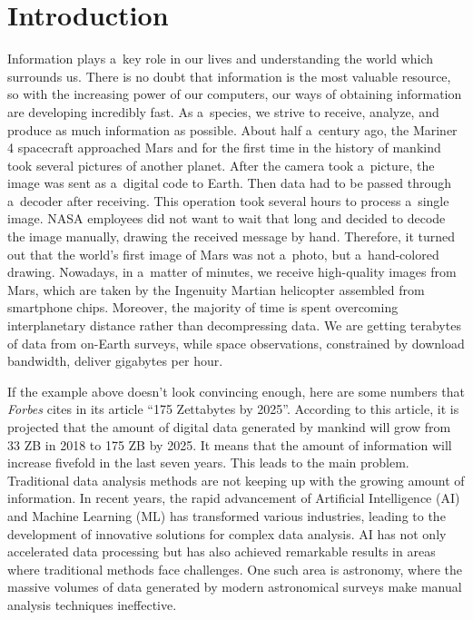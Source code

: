 
% 

\chapter{Introduction}

Information plays a~key role in our lives and understanding the world which surrounds us. There is no doubt that information is the most valuable resource, so with the increasing power of our computers, our ways of obtaining information are developing incredibly fast. As a~species, we strive to receive, analyze, and produce as much information as possible. About half a~century ago, the Mariner 4 spacecraft approached Mars and for the first time in the history of mankind took several pictures of another planet. After the camera took a~picture, the image was sent as a~digital code to Earth. Then data had to be passed through a~decoder after receiving. This operation took several hours to process a~single image. NASA employees did not want to wait that long and decided to decode the image manually, drawing the received message by hand. Therefore, it turned out that the world's first image of Mars was not a~photo, but a~hand-colored drawing. Nowadays, in a~matter of minutes, we receive high-quality images from Mars, which are taken by the Ingenuity Martian helicopter assembled from smartphone chips. Moreover, the majority of time is spent overcoming interplanetary distance rather than decompressing data. We are getting terabytes of data from on-Earth surveys, while space observations, constrained by download bandwidth, deliver gigabytes per hour.

If the example above doesn't look convincing enough, here are some numbers that \emph{Forbes} cites in its article \enquote{175 Zettabytes by 2025}. According to this article, it is projected that the amount of digital data generated by mankind will grow from 33 ZB in 2018 to 175 ZB by 2025. It means that the amount of information will increase fivefold in the last seven years. This leads to the main problem. Traditional data analysis methods are not keeping up with the growing amount of information. In recent years, the rapid advancement of Artificial Intelligence (AI) and Machine Learning (ML) has transformed various industries, leading to the development of innovative solutions for complex data analysis. AI has not only accelerated data processing but has also achieved remarkable results in areas where traditional methods face challenges. One such area is astronomy, where the massive volumes of data generated by modern astronomical surveys make manual analysis techniques ineffective.

